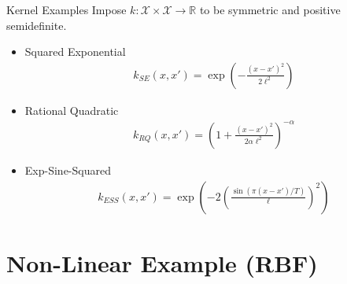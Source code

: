 \documentclass[10pt]{beamer}
\begin{document}
\begin{frame}{Kernel Examples}
Impose $k:\mathcal{X}\times\mathcal{X}\longrightarrow \mathbb{R}$ to be symmetric and positive semidefinite. 
\begin{itemize}
\item Squared Exponential 
\begin{align*}
k_{SE}(x, x') = \exp\left(- \frac{(x - x')^2}{2\ell ^2}\right)
\end{align*}
\item Rational Quadratic 
\begin{align*}
k_{RQ}(x, x') = \left(1 + \frac{(x - x')^2}{2\alpha\ell^2}\right)^{-\alpha}
\end{align*}
\item Exp-Sine-Squared 
\begin{align*}
k_{ESS} (x, x')= \exp\left(-2 \left(\frac{\sin(\pi (x - x')/T )}{\ell}\right)^2\right)
\end{align*}
\end{itemize}
\end{frame}

\section{Non-Linear Example (RBF)}
\end{document}
